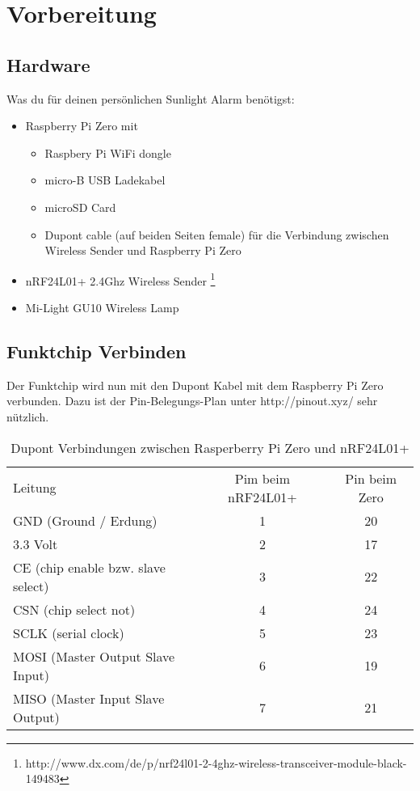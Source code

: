 

\newcommand{\SUBJECT}{Dokumentation}
\newcommand{\TITLE}{Sunrise Clock}



\section{Vorbereitung}

\subsection{Hardware}
Was du für deinen persönlichen Sunlight Alarm benötigst:
\begin{itemize}
	\item Raspberry Pi Zero mit 
	\begin{itemize}
		\item Raspbery Pi WiFi dongle
		\item micro-B USB Ladekabel
		\item microSD Card
		\item Dupont cable (auf beiden Seiten female) für die Verbindung zwischen Wireless Sender und Raspberry Pi Zero
	\end{itemize}
	\item nRF24L01+ 2.4Ghz Wireless Sender \footnote{http://www.dx.com/de/p/nrf24l01-2-4ghz-wireless-transceiver-module-black-149483}
	\item Mi-Light GU10 Wireless Lamp
\end{itemize}

\subsection{Funktchip Verbinden}
Der Funktchip wird nun mit den Dupont Kabel mit dem Raspberry Pi Zero verbunden. Dazu ist der Pin-Belegungs-Plan unter http://pinout.xyz/ sehr nützlich.
\begin{table}[h]
\centering
\begin{tabu} to \linewidth {l c c}
	\toprule
	Leitung & Pim beim nRF24L01+ & Pin beim Zero \\
	GND (Ground / Erdung) & 1 & 20 \\
	3.3 Volt & 2 & 17 \\
	CE (chip enable bzw. slave select) & 3 & 22 \\
	CSN (chip select not) & 4 & 24 \\
	SCLK (serial clock) & 5 & 23 \\
	MOSI (Master Output Slave Input) & 6 & 19 \\
	MISO (Master Input Slave Output) & 7 & 21 \\
	\bottomrule
	\end{tabu}
	\caption{Dupont Verbindungen zwischen Rasperberry Pi Zero und nRF24L01+}
\end{table}

